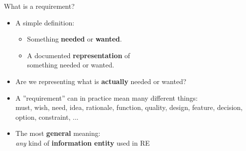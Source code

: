 
\begin{Slide}{What is a requirement?}

\begin{itemize}
\item A simple definition:
\begin{itemize}
\item Something \textbf{needed} or \textbf{wanted}.
\item A documented \textbf{representation} of\\something needed or wanted.

\end{itemize}
\item Are we representing what is \textbf{actually} needed or wanted? 

\item A ''requirement'' can in practice mean many different things:\\
  must, wish, need, idea, rationale, function, quality, design, feature, decision, option, constraint, ...

\item The most \textbf{general} meaning:\\
  \textit{any} kind of \textbf{information entity} used in RE

\end{itemize}
\end{Slide}